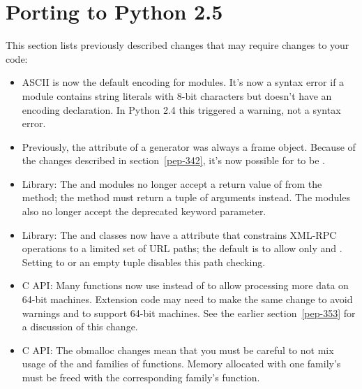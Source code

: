 \documentclass{howto}
\begin{document}
\section{Porting to Python 2.5\label{porting}}

This section lists previously described changes that may require
changes to your code:

\begin{itemize}

\item ASCII is now the default encoding for modules.  It's now 
a syntax error if a module contains string literals with 8-bit
characters but doesn't have an encoding declaration.  In Python 2.4
this triggered a warning, not a syntax error.

\item Previously, the  attribute of a generator
was always a frame object.  Because of the  changes
described in section~\ref{pep-342}, it's now possible
for  to be .


\item Library: The  and  modules no
longer accept a return value of  from the
 method; the method must return a tuple of
arguments instead.  The modules also no longer accept the deprecated
 keyword parameter.

\item Library: The  and  
classes now have a  attribute that constrains
XML-RPC operations to a limited set of URL paths; the default is
to allow only  and .  Setting 
 to  or an empty tuple disables 
this path checking.

\item C API: Many functions now use  
instead of  to allow processing more data on 64-bit
machines.  Extension code may need to make the same change to avoid
warnings and to support 64-bit machines.  See the earlier
section~\ref{pep-353} for a discussion of this change.

\item C API: 
The obmalloc changes mean that 
you must be careful to not mix usage 
of the  and 
families of functions. Memory allocated with 
one family's  must be 
freed with the corresponding family's  function.

\end{itemize}
\end{document}
